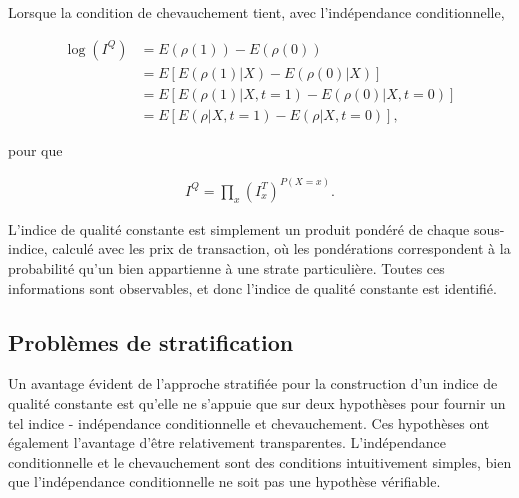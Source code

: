 \documentclass[
]{article}
\begin{document}
Lorsque la condition de chevauchement tient, avec l'indépendance conditionnelle,

\begin{align*}
\log (I^{Q}) &= E(\rho(1)) - E(\rho(0)) \\
&= E[E(\rho(1) | X) - E(\rho(0) | X)] \\
&= E[E(\rho(1) | X, t = 1) - E(\rho(0) | X, t = 0)] \\
&= E[E(\rho | X, t = 1) - E(\rho | X, t = 0)],
\end{align*}

pour que

\begin{align*}
I^{Q} = \prod_{x} (I^{T}_{x})^{P(X = x)}.
\end{align*}

L'indice de qualité constante est simplement un produit pondéré de chaque sous-indice, calculé avec les prix de transaction, où les pondérations correspondent à la probabilité qu'un bien appartienne à une strate particulière. Toutes ces informations sont observables, et donc l'indice de qualité constante est identifié.

\hypertarget{probluxe8mes-de-stratification}{%
\subsection{Problèmes de stratification}\label{probluxe8mes-de-stratification}}

Un avantage évident de l'approche stratifiée pour la construction d'un indice de qualité constante est qu'elle ne s'appuie que sur deux hypothèses pour fournir un tel indice - indépendance conditionnelle et chevauchement. Ces hypothèses ont également l'avantage d'être relativement transparentes. L'indépendance conditionnelle et le chevauchement sont des conditions intuitivement simples, bien que l'indépendance conditionnelle ne soit pas une hypothèse vérifiable.
\end{document}
